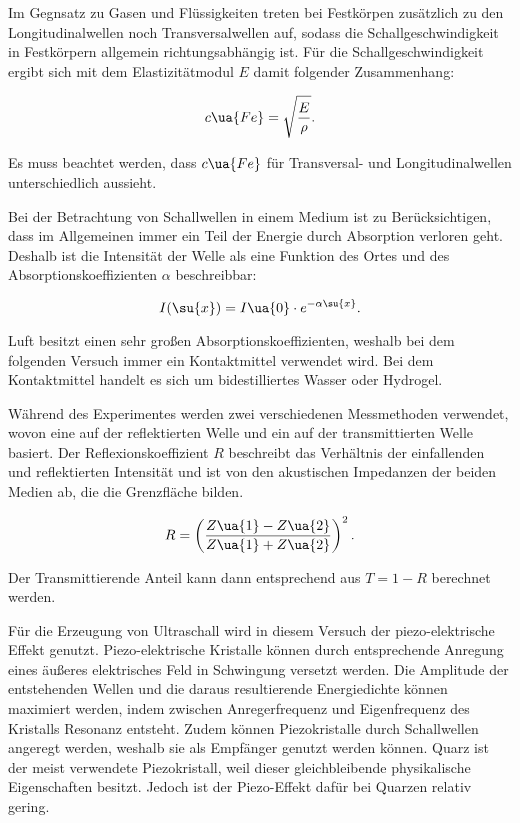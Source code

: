 Im Gegnsatz zu Gasen und Flüssigkeiten treten bei Festkörpen zusätzlich zu den
Longitudinalwellen noch Transversalwellen auf, sodass die Schallgeschwindigkeit
in Festkörpern allgemein richtungsabhängig ist. Für die Schallgeschwindigkeit ergibt
sich mit dem Elastizitätmodul $E$ damit folgender Zusammenhang:

\begin{equation}
  c\ua{Fe} = \sqrt{ \frac{E}{\rho}}.
  \label{eqn:C_Fk}
\end{equation}

Es muss beachtet werden, dass $c\ua{Fe}$ für Transversal- und
Longitudinalwellen unterschiedlich aussieht.

Bei der Betrachtung von Schallwellen in einem Medium ist zu Berücksichtigen, dass
im Allgemeinen immer ein Teil der Energie durch Absorption verloren geht. Deshalb
ist die Intensität der Welle als eine Funktion des Ortes und des
Absorptionskoeffizienten $\alpha$ beschreibbar:

\begin{equation}
  I(\su{x}) = I\ua{0} \cdot e^{-\alpha \su{x}} .
  \label{eqn:Intensität}
\end{equation}

Luft besitzt einen sehr großen Absorptionskoeffizienten, weshalb bei dem folgenden
Versuch immer ein Kontaktmittel verwendet wird. Bei dem Kontaktmittel handelt es sich
um bidestilliertes Wasser oder Hydrogel.

Während des Experimentes werden zwei verschiedenen Messmethoden verwendet, wovon
eine auf der reflektierten Welle und ein auf der transmittierten Welle basiert.
Der Reflexionskoeffizient $R$ beschreibt das Verhältnis der einfallenden und
reflektierten Intensität und ist von den akustischen Impedanzen der beiden
Medien ab, die die Grenzfläche bilden.

\begin{equation}
  R = \left( \frac{Z\ua{1} - Z\ua{2}}{Z\ua{1} + Z\ua{2}} \right)^2.
  \label{eqn:Reflexionskoeffizient}
\end{equation}

Der Transmittierende Anteil kann dann entsprechend aus $T = 1-R$ berechnet werden.

Für die Erzeugung von Ultraschall wird in diesem Versuch der piezo-elektrische
Effekt genutzt. Piezo-elektrische Kristalle können durch entsprechende Anregung
eines äußeres elektrisches Feld in Schwingung versetzt werden. Die Amplitude
der entstehenden Wellen und die daraus resultierende Energiedichte können
maximiert werden, indem zwischen Anregerfrequenz und Eigenfrequenz des Kristalls
Resonanz entsteht.
Zudem können Piezokristalle durch Schallwellen angeregt werden,
weshalb sie als Empfänger genutzt werden können. Quarz ist der
meist verwendete Piezokristall, weil dieser gleichbleibende physikalische
Eigenschaften besitzt. Jedoch ist der Piezo-Effekt dafür bei Quarzen relativ gering.

